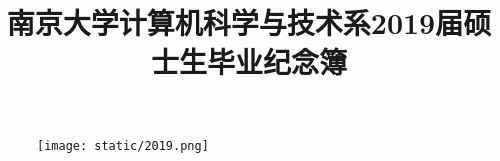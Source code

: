 \documentclass[UTF8,12pt,a4paper,landscape]{article}
\title{南京大学计算机科学与技术系2019届硕士生毕业纪念簿}
\begin{document}
\maketitle
\begin{figure}[h]
	\centering
	\texttt{[image: static/2019.png]}
\end{figure}
\newpage
\begin{multicols}{5}
  \begingroup
    \hypersetup{hidelinks}
    \tableofcontents
  \endgroup
\end{multicols}
\newpage
\end{document}
